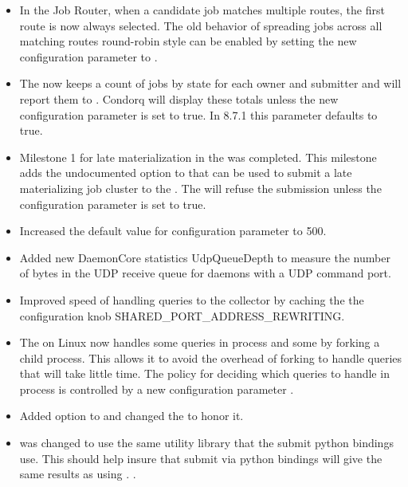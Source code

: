 \begin{itemize}
\item In the Job Router, when a candidate job matches multiple routes,
the first route is now always selected.
The old behavior of spreading jobs across all matching routes round-robin
style can be enabled by setting the new configuration parameter
 to .

\item The  now keeps a count of jobs by state for each owner and submitter
and will report them to . Condor{q} will display these totals unless the new
configuration parameter  is set to true. In 8.7.1
this parameter defaults to true.

\item Milestone 1 for late materialization in the  was completed. This milestone adds the
undocumented option  to  that can be used to submit a late materializing job cluster
to the .  The  will refuse the submission unless the configuration parameter
 is set to true.

\item Increased the default value for configuration parameter
 to 500.

\item Added new DaemonCore statistics UdpQueueDepth to measure the
number of bytes in the UDP receive queue for daemons with a UDP command port.

\item Improved speed of handling queries to the collector by caching the
the configuration knob SHARED\_PORT\_ADDRESS\_REWRITING.

\item The  on Linux now handles some queries in process and some
by forking a child process. This allows it to avoid the overhead of forking to handle
queries that will take little time. The policy for deciding which queries to handle in process
is controlled by a new configuration parameter .

\item Added  option to  and changed the  to honor it.

\item {} was changed to use the same utility library that the submit python bindings use.
This should help insure that submit via python bindings will give the same results as using .
.

\end{itemize}

